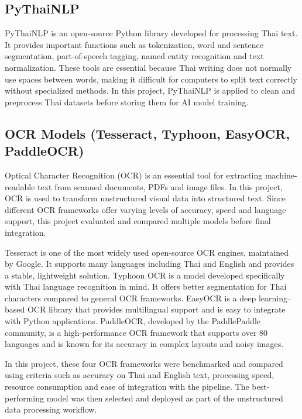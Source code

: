 \documentclass[12pt,oneside,openright,a4paper]{cpe-english-project}
\begin{document}
\subsection{PyThaiNLP}
PyThaiNLP is an open-source Python library developed for processing Thai text. It provides important functions such as tokenization, word and sentence segmentation, part-of-speech tagging, named entity recognition and text normalization. These tools are essential because Thai writing does not normally use spaces between words, making it difficult for computers to split text correctly without specialized methods. In this project, PyThaiNLP is applied to clean and preprocess Thai datasets before storing them for AI model training.

\subsection{OCR Models (Tesseract, Typhoon, EasyOCR, PaddleOCR)}
Optical Character Recognition (OCR) is an essential tool for extracting machine-readable text from scanned documents, PDFs and image files. In this project, OCR is used to transform unstructured visual data into structured text. Since different OCR frameworks offer varying levels of accuracy, speed and language support, this project evaluated and compared multiple models before final integration.

Tesseract is one of the most widely used open-source OCR engines, maintained by Google. It supports many languages including Thai and English and provides a stable, lightweight solution. Typhoon OCR is a model developed specifically with Thai language recognition in mind. It offers better segmentation for Thai characters compared to general OCR frameworks. EasyOCR is a deep learning--based OCR library that provides multilingual support and is easy to integrate with Python applications. PaddleOCR, developed by the PaddlePaddle community, is a high-performance OCR framework that supports over 80 languages and is known for its accuracy in complex layouts and noisy images.

In this project, these four OCR frameworks were benchmarked and compared using criteria such as accuracy on Thai and English text, processing speed, resource consumption and ease of integration with the pipeline. The best-performing model was then selected and deployed as part of the unstructured data processing workflow.
\end{document}

